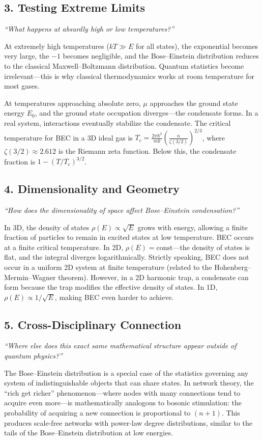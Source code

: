 \documentclass[11pt,openright]{book}
\begin{document}
\subsection*{3. Testing Extreme Limits}
\textit{``What happens at absurdly high or low temperatures?''}

At extremely high temperatures ($kT \gg E$ for all states), the exponential becomes very large, the $-1$ becomes negligible, and the Bose--Einstein distribution reduces to the classical Maxwell--Boltzmann distribution. Quantum statistics become irrelevant---this is why classical thermodynamics works at room temperature for most gases.

At temperatures approaching absolute zero, $\mu$ approaches the ground state energy $E_0$, and the ground state occupation diverges---the condensate forms. In a real system, interactions eventually stabilize the condensate. The critical temperature for BEC in a 3D ideal gas is $T_c = \frac{2\pi\hbar^2}{mk}\left(\frac{n}{\zeta(3/2)}\right)^{2/3}$, where $\zeta(3/2) \approx 2.612$ is the Riemann zeta function. Below this, the condensate fraction is $1 - (T/T_c)^{3/2}$.

\subsection*{4. Dimensionality and Geometry}
\textit{``How does the dimensionality of space affect Bose--Einstein condensation?''}

In 3D, the density of states $\rho(E) \propto \sqrt{E}$ grows with energy, allowing a finite fraction of particles to remain in excited states at low temperature. BEC occurs at a finite critical temperature. In 2D, $\rho(E) = \text{const}$---the density of states is flat, and the integral diverges logarithmically. Strictly speaking, BEC does not occur in a uniform 2D system at finite temperature (related to the Hohenberg--Mermin--Wagner theorem). However, in a 2D harmonic trap, a condensate can form because the trap modifies the effective density of states. In 1D, $\rho(E) \propto 1/\sqrt{E}$, making BEC even harder to achieve.

\subsection*{5. Cross-Disciplinary Connection}
\textit{``Where else does this exact same mathematical structure appear outside of quantum physics?''}

The Bose--Einstein distribution is a special case of the statistics governing any system of indistinguishable objects that can share states. In network theory, the ``rich get richer'' phenomenon---where nodes with many connections tend to acquire even more---is mathematically analogous to bosonic stimulation: the probability of acquiring a new connection is proportional to $(n + 1)$. This produces scale-free networks with power-law degree distributions, similar to the tails of the Bose--Einstein distribution at low energies.
\end{document}
